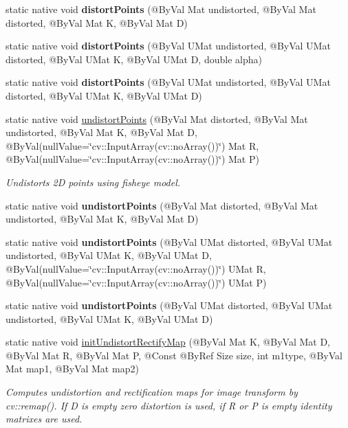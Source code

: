 \begin{DoxyCompactItemize}
static native void {\bfseries distort\+Points} (@By\+Val Mat undistorted, @By\+Val Mat distorted, @By\+Val Mat K, @By\+Val Mat D)
\item 
static native void {\bfseries distort\+Points} (@By\+Val U\+Mat undistorted, @By\+Val U\+Mat distorted, @By\+Val U\+Mat K, @By\+Val U\+Mat D, double alpha)
\item 
static native void {\bfseries distort\+Points} (@By\+Val U\+Mat undistorted, @By\+Val U\+Mat distorted, @By\+Val U\+Mat K, @By\+Val U\+Mat D)
\item 
static native void \hyperlink{group__calib3d__fisheye_ga76244e0842b37e17c2b00ef9a015b99a}{undistort\+Points} (@By\+Val Mat distorted, @By\+Val Mat undistorted, @By\+Val Mat K, @By\+Val Mat D, @By\+Val(null\+Value=\char`\"{}cv\+::\+Input\+Array(cv\+::no\+Array())\char`\"{}) Mat R, @By\+Val(null\+Value=\char`\"{}cv\+::\+Input\+Array(cv\+::no\+Array())\char`\"{}) Mat P)
\begin{DoxyCompactList}\small\item\em Undistorts 2D points using fisheye model. \end{DoxyCompactList}\item 
static native void {\bfseries undistort\+Points} (@By\+Val Mat distorted, @By\+Val Mat undistorted, @By\+Val Mat K, @By\+Val Mat D)
\item 
static native void {\bfseries undistort\+Points} (@By\+Val U\+Mat distorted, @By\+Val U\+Mat undistorted, @By\+Val U\+Mat K, @By\+Val U\+Mat D, @By\+Val(null\+Value=\char`\"{}cv\+::\+Input\+Array(cv\+::no\+Array())\char`\"{}) U\+Mat R, @By\+Val(null\+Value=\char`\"{}cv\+::\+Input\+Array(cv\+::no\+Array())\char`\"{}) U\+Mat P)
\item 
static native void {\bfseries undistort\+Points} (@By\+Val U\+Mat distorted, @By\+Val U\+Mat undistorted, @By\+Val U\+Mat K, @By\+Val U\+Mat D)
\item 
static native void \hyperlink{group__calib3d__fisheye_ga507f430243a293690d2c405dec6a0e82}{init\+Undistort\+Rectify\+Map} (@By\+Val Mat K, @By\+Val Mat D, @By\+Val Mat R, @By\+Val Mat P, @Const @By\+Ref Size size, int m1type, @By\+Val Mat map1, @By\+Val Mat map2)
\begin{DoxyCompactList}\small\item\em Computes undistortion and rectification maps for image transform by cv\+::remap(). If D is empty zero distortion is used, if R or P is empty identity matrixes are used. \end{DoxyCompactList}\item 

\end{DoxyCompactItemize}
